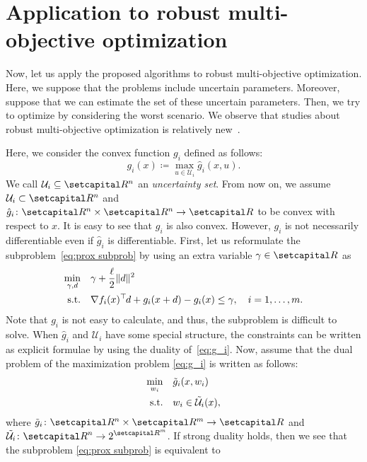 \documentclass[../../main]{subfiles}
\begin{document}
\section{Application to robust multi-objective optimization} \label{sec:pgm:robust}
Now, let us apply the proposed algorithms to robust multi-objective optimization. Here, we suppose that the problems include uncertain parameters. Moreover, suppose that we can estimate the set of these uncertain parameters. Then, we try to optimize by considering the worst scenario. We observe that studies about robust multi-objective optimization is relatively new~\cite{Ehrgott2014,Fliege2014,Morishita2016}.

Here, we consider the convex function $g_i$ defined as follows:
\begin{equation} \label{eq:g_i}
g_i(x) \coloneqq \max_{u \in {\mathcal{U}}_i } \hat{g}_i (x,u).
\end{equation}
We call ${\mathcal{U}}_i \subseteq \setR^n$ an \emph{uncertainty set}. From now on, we assume ${\mathcal{U}}_i \subset \setR^n$ and $\hat{g}_i \colon \setR^n \times \setR^n \to \setR$ to be convex with respect to $x$. It is easy to see that $g_i$ is also convex. However, $g_i$ is not necessarily differentiable even if $\hat{g}_i$ is differentiable. First, let us reformulate the subproblem~\cref{eq:prox subprob} by using an extra variable $\gamma \in \setR$ as
\begin{align}
\begin{aligned}
\min_{\gamma, d} \quad   &\gamma + \frac{\ell}{2}\|d\|^2  \\ 
\mathrm{s.t.}    \quad   &\nabla f_i(x)^\top\hspace{-1pt} d + g_i(x+d) - g_i(x) \leq \gamma, \quad i = 1,\ldots,m.
\end{aligned}
\end{align}
Note that $g_i$ is not easy to calculate, and thus, the subproblem is difficult to solve. When $\hat{g}_i$ and $\mathcal{U}_i$ have some special structure, the constraints can be written as explicit formulae by using the duality of~\cref{eq:g_i}. Now, assume that the dual problem of the maximization problem \cref{eq:g_i} is written as follows:
\begin{align}
\min_{w_i} \quad &\tilde{g}_i (x, w_i)  \\ 
\mathrm{s.t.}    \quad   &w_i \in \tilde{\mathcal{U}}_i (x),
\end{align}
where $\tilde{g}_i \colon \setR^n \times \setR^m \to \setR$ and $\displaystyle \tilde{\mathcal{U}}_i \colon \setR^n \to 2^{\setR^m}$. If strong duality holds, then we see that the subproblem \cref{eq:prox subprob} is equivalent to
\end{document}
